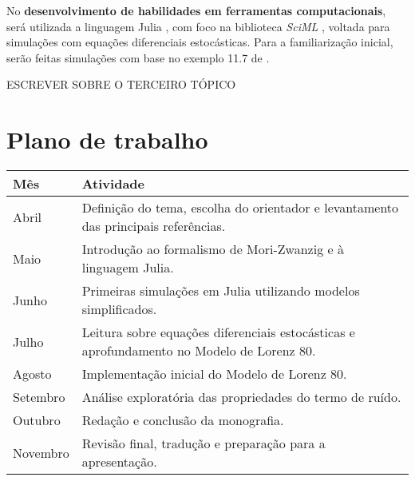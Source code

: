\documentclass[12pt]{article}
\begin{document}
No \textbf{desenvolvimento de habilidades em ferramentas computacionais}, será utilizada a linguagem Julia \citep{julialang}, com foco na biblioteca \textit{SciML} \citep{SDEJulia}, voltada para simulações com equações diferenciais estocásticas. Para a familiarização inicial, serão feitas simulações com base no exemplo 11.7 de \citep[p.~169]{Pavliotis2008}.

ESCREVER SOBRE O TERCEIRO TÓPICO

\section*{Plano de trabalho}
\begin{center}
\renewcommand{\arraystretch}{1.5}
\begin{tabular}{p{3cm}p{10cm}}
    \toprule
    \textbf{Mês} & \textbf{Atividade} \\
    \midrule
    Abril   & Definição do tema, escolha do orientador e levantamento das principais referências. \\
    Maio    & Introdução ao formalismo de Mori-Zwanzig e à linguagem Julia. \\
    Junho   & Primeiras simulações em Julia utilizando modelos simplificados. \\
    Julho   & Leitura sobre equações diferenciais estocásticas e aprofundamento no Modelo de Lorenz 80. \\
    Agosto  & Implementação inicial do Modelo de Lorenz 80. \\
    Setembro& Análise exploratória das propriedades do termo de ruído. \\
    Outubro & Redação e conclusão da monografia. \\
    Novembro& Revisão final, tradução e preparação para a apresentação. \\
    \bottomrule
\end{tabular}
\end{center}
\newpage
\nocite{*}
\printbibliography[title={Referências}, label={sec:bib}]
\end{document}
